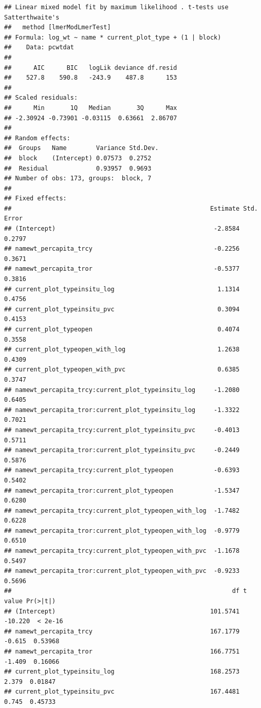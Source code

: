 \documentclass[
]{article}
\begin{document}
\begin{verbatim}
## Linear mixed model fit by maximum likelihood . t-tests use Satterthwaite's
##   method [lmerModLmerTest]
## Formula: log_wt ~ name * current_plot_type + (1 | block)
##    Data: pcwtdat
## 
##      AIC      BIC   logLik deviance df.resid 
##    527.8    590.8   -243.9    487.8      153 
## 
## Scaled residuals: 
##      Min       1Q   Median       3Q      Max 
## -2.30924 -0.73901 -0.03115  0.63661  2.86707 
## 
## Random effects:
##  Groups   Name        Variance Std.Dev.
##  block    (Intercept) 0.07573  0.2752  
##  Residual             0.93957  0.9693  
## Number of obs: 173, groups:  block, 7
## 
## Fixed effects:
##                                                      Estimate Std. Error
## (Intercept)                                           -2.8584     0.2797
## namewt_percapita_trcy                                 -0.2256     0.3671
## namewt_percapita_tror                                 -0.5377     0.3816
## current_plot_typeinsitu_log                            1.1314     0.4756
## current_plot_typeinsitu_pvc                            0.3094     0.4153
## current_plot_typeopen                                  0.4074     0.3558
## current_plot_typeopen_with_log                         1.2638     0.4309
## current_plot_typeopen_with_pvc                         0.6385     0.3747
## namewt_percapita_trcy:current_plot_typeinsitu_log     -1.2080     0.6405
## namewt_percapita_tror:current_plot_typeinsitu_log     -1.3322     0.7021
## namewt_percapita_trcy:current_plot_typeinsitu_pvc     -0.4013     0.5711
## namewt_percapita_tror:current_plot_typeinsitu_pvc     -0.2449     0.5876
## namewt_percapita_trcy:current_plot_typeopen           -0.6393     0.5402
## namewt_percapita_tror:current_plot_typeopen           -1.5347     0.6280
## namewt_percapita_trcy:current_plot_typeopen_with_log  -1.7482     0.6228
## namewt_percapita_tror:current_plot_typeopen_with_log  -0.9779     0.6510
## namewt_percapita_trcy:current_plot_typeopen_with_pvc  -1.1678     0.5497
## namewt_percapita_tror:current_plot_typeopen_with_pvc  -0.9233     0.5696
##                                                            df t value Pr(>|t|)
## (Intercept)                                          101.5741 -10.220  < 2e-16
## namewt_percapita_trcy                                167.1779  -0.615  0.53968
## namewt_percapita_tror                                166.7751  -1.409  0.16066
## current_plot_typeinsitu_log                          168.2573   2.379  0.01847
## current_plot_typeinsitu_pvc                          167.4481   0.745  0.45733

\end{verbatim}
\end{document}
